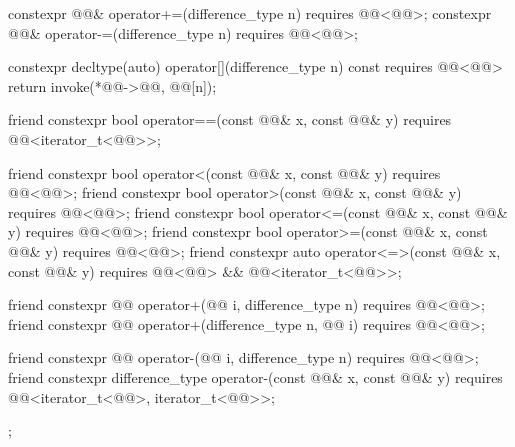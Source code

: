 \begin{codeblock}
{{    constexpr @@& operator+=(difference_type n)
      requires @@<@@>;
    constexpr @@& operator-=(difference_type n)
      requires @@<@@>;

    constexpr decltype(auto) operator[](difference_type n) const
      requires @@<@@> {
      return invoke(*@@->@@, @@[n]);
    }

    friend constexpr bool operator==(const @@& x, const @@& y)
      requires @@<iterator_t<@@>>;

    friend constexpr bool operator<(const @@& x, const @@& y)
      requires @@<@@>;
    friend constexpr bool operator>(const @@& x, const @@& y)
      requires @@<@@>;
    friend constexpr bool operator<=(const @@& x, const @@& y)
      requires @@<@@>;
    friend constexpr bool operator>=(const @@& x, const @@& y)
      requires @@<@@>;
    friend constexpr auto operator<=>(const @@& x, const @@& y)
      requires @@<@@> && @@<iterator_t<@@>>;

    friend constexpr @@ operator+(@@ i, difference_type n)
      requires @@<@@>;
    friend constexpr @@ operator+(difference_type n, @@ i)
      requires @@<@@>;

    friend constexpr @@ operator-(@@ i, difference_type n)
      requires @@<@@>;
    friend constexpr difference_type operator-(const @@& x, const @@& y)
      requires @@<iterator_t<@@>, iterator_t<@@>>;
  };
}
\end{codeblock}

